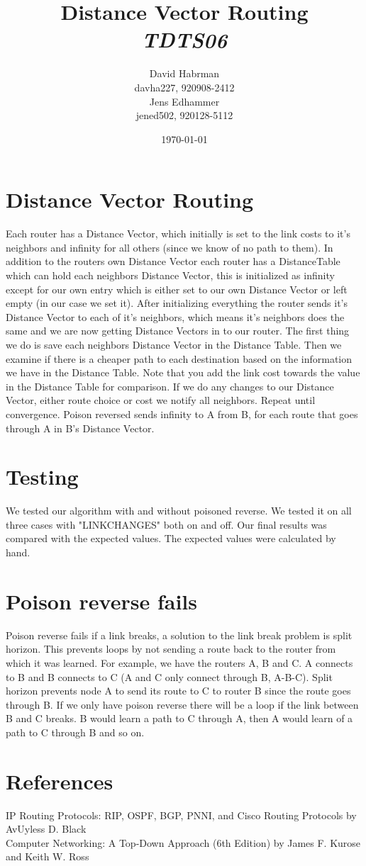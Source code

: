 \documentclass[10pt]{article}
\title{Distance Vector Routing\\
\emph{TDTS06}}
\author{David Habrman \\ davha227, 920908-2412\\
Jens Edhammer \\ jened502, 920128-5112 }
\date{\today}
\begin{document}
\maketitle

\newpage
\tableofcontents
\newpage

\section{Distance Vector Routing}
Each router has a Distance Vector, which initially is set to the link costs to it's neighbors and infinity for all others (since we know of no path to them). In addition to the routers own Distance Vector each router has a DistanceTable which can hold each neighbors Distance Vector, this is initialized as infinity except for our own entry which is either set to our own Distance Vector or left empty (in our case we set it). After initializing everything the router sends it's Distance Vector to each of it's neighbors, which means it's neighbors does the same and we are now getting Distance Vectors in to our router. The first thing we do is save each neighbors Distance Vector in the Distance Table. Then we examine if there is a cheaper path to each destination based on the information we have in the Distance Table. Note that you add the link cost towards the value in the Distance Table for comparison. If we do any changes to our Distance Vector, either route choice or cost we notify all neighbors. Repeat until convergence. Poison reversed sends infinity to A from B, for each route that goes through A in B's Distance Vector.

\section{Testing}
We tested our algorithm with and without poisoned reverse. We tested it on all
three cases with "LINKCHANGES" both on and off. Our final results was compared
with the expected values. The expected values were calculated by hand.

\section{Poison reverse fails}
Poison reverse fails if a link breaks, a solution to the link break problem is
split horizon. This prevents loops by not sending a route back to the router
from which it was learned. For example, we have the routers A, B and C. A
connects to B and B connects to C (A and C only connect through B, A-B-C).
Split horizon prevents node A to send its route to C to router B since the
route goes through B. If we only have poison reverse there will be a loop
if the link between B and C breaks. B would learn a path to C through A,
then A would learn of a path to C through B and so on.

\section{References}
IP Routing Protocols: RIP, OSPF, BGP, PNNI, and Cisco Routing Protocols by  AvUyless D. Black \\
Computer Networking: A Top-Down Approach (6th Edition) by James F. Kurose and Keith W. Ross
\end{document}
